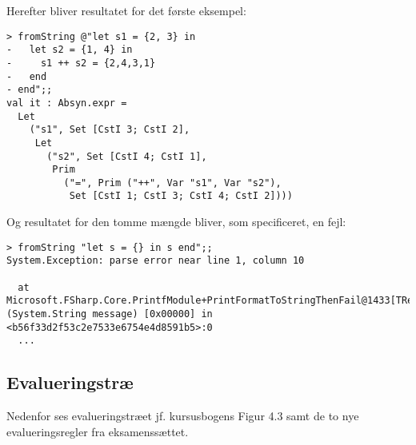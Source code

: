 Herefter bliver resultatet for det første eksempel:

\begin{verbatim}
> fromString @"let s1 = {2, 3} in
-   let s2 = {1, 4} in
-     s1 ++ s2 = {2,4,3,1}
-   end
- end";;
val it : Absyn.expr =
  Let
    ("s1", Set [CstI 3; CstI 2],
     Let
       ("s2", Set [CstI 4; CstI 1],
        Prim
          ("=", Prim ("++", Var "s1", Var "s2"),
           Set [CstI 1; CstI 3; CstI 4; CstI 2])))
\end{verbatim}

Og resultatet for den tomme mængde bliver, som specificeret, en fejl:

\begin{verbatim}
> fromString "let s = {} in s end";;
System.Exception: parse error near line 1, column 10

  at Microsoft.FSharp.Core.PrintfModule+PrintFormatToStringThenFail@1433[TResult].Invoke (System.String message) [0x00000] in <b56f33d2f53c2e7533e6754e4d8591b5>:0
  ...
\end{verbatim}

\subsection{Evalueringstræ}

Nedenfor ses evalueringstræet jf. kursusbogens Figur 4.3 samt de to nye evalueringsregler fra eksamenssættet.

\begin{figure}[H]
    \hbox{}
\end{figure}

